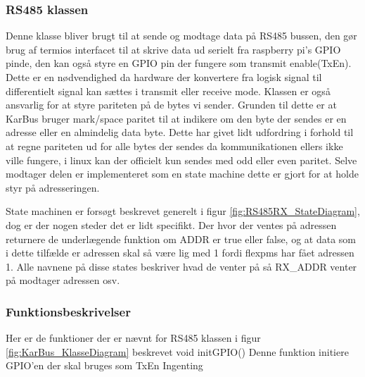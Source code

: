 {
}

\subsubsection{RS485 klassen}
Denne klasse bliver brugt til at sende og modtage data på RS485 bussen, den gør brug af termios interfacet til at skrive data ud serielt fra raspberry pi's GPIO pinde, den kan også styre en GPIO pin der fungere som transmit enable(TxEn). Dette er en nødvendighed da hardware der konvertere fra logisk signal til differentielt signal kan sættes i transmit eller receive mode. Klassen er også ansvarlig for at styre pariteten på de bytes vi sender. Grunden til dette er at KarBus bruger mark/space paritet til at indikere om den byte der sendes er en adresse eller en almindelig data byte. Dette har givet lidt udfordring i forhold til at regne pariteten ud for alle bytes der sendes da kommunikationen ellers ikke ville fungere, i linux kan der officielt kun sendes med odd eller even paritet.
Selve modtager delen er implementeret som en state machine dette er gjort for at holde styr på adresseringen.


State machinen er forsøgt beskrevet generelt i figur \ref{fig:RS485RX_StateDiagram}, dog er der nogen steder det er lidt specifikt. Der hvor der ventes på adressen returnere de underlægende funktion om ADDR er true eller false, og at data som i dette tilfælde er adressen skal så være lig med 1 fordi flexpms har fået adressen 1. Alle navnene på disse states beskriver hvad de venter på så RX\_ADDR venter på modtager adressen osv.

\subsubsection{Funktionsbeskrivelser}
Her er de funktioner der er nævnt for RS485 klassen i figur \ref{fig:KarBus_KlasseDiagram} beskrevet
\funk
{void initGPIO()}
{Denne funktion initiere GPIO'en der skal bruges som TxEn}
{Ingenting}
{
}

